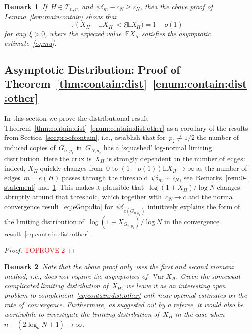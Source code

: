 \documentclass{article}
\newcommand{\eps}{\varepsilon}
\renewcommand{\Pr}{\mathbb{P}}
\newcommand{\E}{\mathbb{E}}
\newcommand{\cT}{\mathcal{T}}
\newcommand\Var{\operatorname{Var}}
\newtheorem{remark}{Remark}
\newcommand\bigpar[1]{\bigl(#1\bigr)}
\newcommand{\refT}[1]{Theorem~\ref{#1}}
\newcommand{\refL}[1]{Lemma~\ref{#1}}
\newcommand{\refS}[1]{Section~\ref{#1}}
\begin{document}
\begin{remark}\label{rem:maincontain}If~$H \in \cT_{n,m}$ and~${\psi\delta_m-c_N \ge \eps_N}$, 
then the above proof of \refL{lem:maincontain} shows that 
\begin{equation*}\label{eq:secondmoment:refined}
\Pr\bigpar{|X_H-\E X_H| < \xi \E X_H} = 1-o(1)
\end{equation*}
for any~$\xi>0$, 
where the expected value~$\E X_H$ satisfies the asymptotic estimate~\eqref{eq:mu}. 
\end{remark}




\subsection{Asymptotic Distribution: Proof of \refT{thm:contain:dist}~\ref{enum:contain:dist:other}}\label{sec:contain:dist}
In this section we prove the distributional result \refT{thm:contain:dist}~\ref{enum:contain:dist:other}
as a corollary of the results from \refS{sec:proofcontain}, i.e., establish that for~$p_2 \neq 1/2$ the number of induced copies of~$G_{n,p_1}$ in~$G_{N,p_2}$ has a `squashed' log-normal limiting distribution.
Here the crux is~$X_H$ is strongly dependent on the number of edges: indeed, $X_H$ quickly changes from~$0$ to $(1+o(1)) \E X_H \to \infty$ as the number of edges~$m=e(H)$ passes through the threshold~${\psi\delta_m \sim c_N}$, see~Remarks~\ref{rem:0-statement} and~\ref{rem:maincontain}. 
This makes it plausible that~${\log(1+X_H)/\log N}$ changes abruptly around that threshold, which together with~$c_N \to c$ and the normal convergence result~\eqref{eq:eGnp:dto} for~$\psi\delta_{e(G_{n,p_1})}$
intuitively explains the form of the limiting distribution of~$\log(1+X_{G_{n,p_1}})/\log N$ in the convergence result~\eqref{eq:contain:dist:other}. 
\begin{proof}\textcolor{red}{TOPROVE 2}\end{proof}


\begin{remark}\label{rem:sec:contain:dist}
Note that the above proof only uses the first and second moment method, i.e., does not require the asymptotics of~$\Var X_H$.
Given the somewhat complicated limiting distribution of~$X_H$, we leave it as an interesting open problem to complement~\eqref{eq:contain:dist:other} with near-optimal estimates on the rate of~convergence. 
Furthermore, as suggested out by a referee, it would also be worthwhile to investigate the limiting distribution of~$X_H$ in the case when~$n-(2\log_a N+1) \to \infty$. 
\end{remark}
\end{document}
